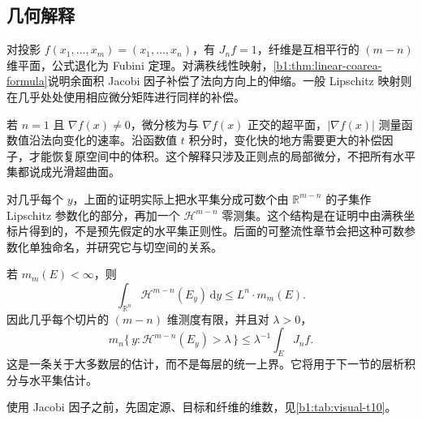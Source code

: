 \subsection{几何解释}
\label{b1:subsec:180204}

对投影 \(f(x_1,\ldots,x_m)=(x_1,\ldots,x_n)\)，有 \(J_nf=1\)，纤维是互相平行的 \((m-n)\) 维平面，公式退化为 Fubini 定理。对满秩线性映射，\cref{b1:thm:linear-coarea-formula}说明余面积 Jacobi 因子补偿了法向方向上的伸缩。一般 Lipschitz 映射则在几乎处处使用相应微分矩阵进行同样的补偿。

\ProseParagraphBreak

若 \(n=1\) 且 \(\nabla f(x)\ne0\)，微分核为与 \(\nabla f(x)\) 正交的超平面，\(|\nabla f(x)|\) 测量函数值沿法向变化的速率。沿函数值 \(t\) 积分时，变化快的地方需要更大的补偿因子，才能恢复原空间中的体积。这个解释只涉及正则点的局部微分，不把所有水平集都说成光滑超曲面。

\ProseParagraphBreak

对几乎每个 \(y\)，上面的证明实际上把水平集分成可数个由 \(\mathbb R^{m-n}\) 的子集作 Lipschitz 参数化的部分，再加一个 \(\mathcal H^{m-n}\) 零测集。这个结构是在证明中由满秩坐标片得到的，不是预先假定的水平集正则性。后面的可整流性章节会把这种可数参数化单独命名，并研究它与切空间的关系。

\ProseParagraphBreak

若 \(m_m(E)<\infty\)，则
\[
 \int_{\mathbb R^n}\mathcal H^{m-n}(E_y)\,\mathrm dy
 \leq L^n\cdot m_m(E).
\]
因此几乎每个切片的 \((m-n)\) 维测度有限，并且对 \(\lambda>0\)，
\[
 m_n\{\,y:\mathcal H^{m-n}(E_y)>\lambda\,\}
 \leq\lambda^{-1}\int_EJ_nf.
\]
这是一条关于大多数层的估计，而不是每层的统一上界。它将用于下一节的层析积分与水平集估计。

使用 Jacobi 因子之前，先固定源、目标和纤维的维数，见\cref{b1:tab:visual-t10}。

